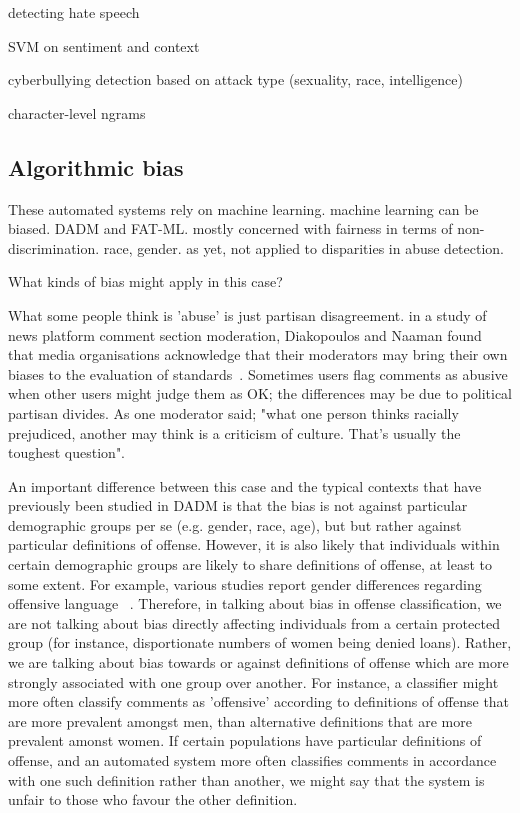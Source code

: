 \documentclass[runningheads,a4paper]{llncs}
\begin{document}
detecting hate speech ~\cite{warner2012detecting,yin2009detection,sood2012automatic}

SVM on sentiment and context

cyberbullying detection based on attack type (sexuality, race, intelligence) ~\cite{dinakar2011modeling}

character-level ngrams ~\cite{nobata2016abusive}

\subsection{Algorithmic bias}

These automated systems rely on machine learning. machine learning can be biased.
DADM and FAT-ML.
mostly concerned with fairness in terms of non-discrimination. race, gender. as yet, not applied to disparities in abuse detection.

What kinds of bias might apply in this case?

What some people think is 'abuse' is just partisan disagreement. in a study of news platform comment section moderation, Diakopoulos and Naaman found that media organisations acknowledge that their moderators may bring their own biases to the evaluation of standards~\cite{diakopoulos2011towards}. Sometimes users flag comments as abusive when other users might judge them as OK; the differences may be due to political partisan divides. As one moderator said; "what one person thinks racially prejudiced, another may think is a criticism of culture. That’s usually the toughest question".

An important difference between this case and the typical contexts that have previously been studied in DADM is that the bias is not against particular demographic groups per se (e.g. gender, race, age), but but rather against particular definitions of offense. However, it is also likely that individuals within certain demographic groups are likely to share definitions of offense, at least to some extent. For example, various studies report gender differences regarding offensive language ~\cite{johnson1985sex,sutton2001bitches,jay1992cursing}. Therefore, in talking about bias in offense classification, we are not talking about bias directly affecting individuals from a certain protected group (for instance, disportionate numbers of women being denied loans). Rather, we are talking about bias towards or against definitions of offense which are more strongly associated with one group over another. For instance, a classifier might more often classify comments as 'offensive' according to definitions of offense that are more prevalent amongst men, than alternative definitions that are more prevalent amonst women. If certain populations have particular definitions of offense, and an automated system more often classifies comments in accordance with one such definition rather than another, we might say that the system is unfair to those who favour the other definition.
\end{document}
